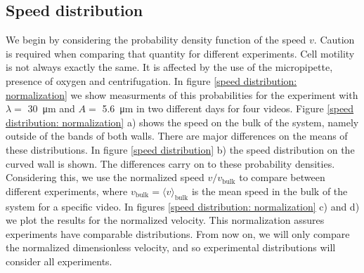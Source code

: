 
\subsection{Speed distribution}

We begin by considering the probability density function of the speed $v$. Caution is required when comparing that quantity for different experiments. Cell motility is not always exactly the same. It is affected by the use of the micropipette, presence of oxygen and centrifugation. In figure \ref{speed distribution: normalization} we show measurments of this probabilities for the experiment with $\lambda=$ \SI{30}{\micro\meter} and $A=$ \SI{5.6}{\micro\meter} in two different days for four videos. Figure \ref{speed distribution: normalization} a) shows the speed on the bulk of the system, namely outside of the bands of both walls. There are major differences on the means of these distributions. In figure \ref{speed distribution} b) the speed distribution on the curved wall is shown. The differences carry on to these probability densities. Considering this, we use the normalized speed $v/v_{\text{bulk}}$ to compare between different experiments, where $v_{\text{bulk}} = \langle v \rangle_{\text{bulk}} $ is the mean speed in the bulk of the system for a specific video. In figures \ref{speed distribution: normalization} c) and d) we plot the results for the normalized velocity. This normalization assures experiments have comparable distributions. From now on, we will only compare the normalized dimensionless velocity, and so experimental distributions will consider all experiments.

